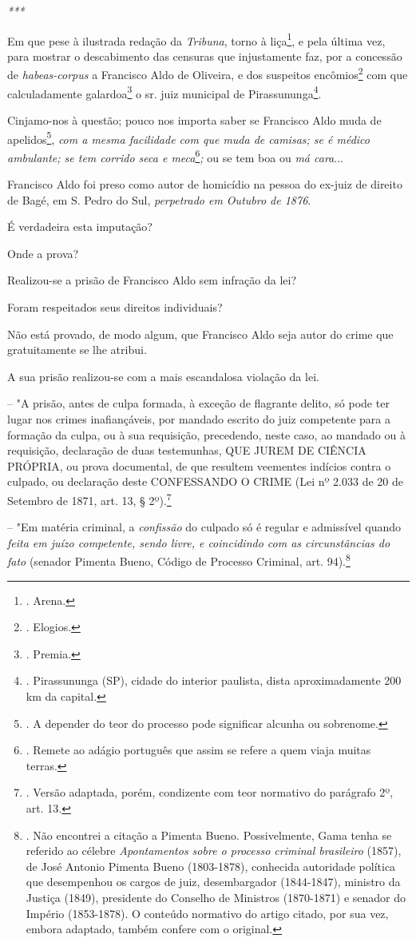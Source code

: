 \emph{***}

Em que pese à ilustrada redação da \emph{Tribuna}, torno à
liça\footnote{. Arena.}, e pela última vez, para mostrar o descabimento
das censuras que injustamente faz, por a concessão de
\emph{habeas-corpus} a Francisco Aldo de Oliveira, e dos suspeitos
encômios\footnote{. Elogios.} com que calculadamente galardoa\footnote{.
  Premia.} o sr. juiz municipal de Pirassununga\footnote{. Pirassununga
  (SP), cidade do interior paulista, dista aproximadamente 200 km da
  capital.}.

Cinjamo-nos à questão; pouco nos importa saber se Francisco Aldo muda de
apelidos\footnote{. A depender do teor do processo pode significar
  alcunha ou sobrenome.}, \emph{com a mesma facilidade com que muda de
camisas; se é médico ambulante; se tem corrido seca e meca}\footnote{.
  Remete ao adágio português que assim se refere a quem viaja muitas
  terras.}\emph{;} ou se tem boa ou \emph{má cara}...

Francisco Aldo foi preso como autor de homicídio na pessoa do ex-juiz de
direito de Bagé, em S. Pedro do Sul, \emph{perpetrado em Outubro de
1876}.

É verdadeira esta imputação?

Onde a prova?

Realizou-se a prisão de Francisco Aldo sem infração da lei?

Foram respeitados seus direitos individuais?

Não está provado, de modo algum, que Francisco Aldo seja autor do crime
que gratuitamente se lhe atribui.

A sua prisão realizou-se com a mais escandalosa violação da lei.

-- "A prisão, antes de culpa formada, à exceção de flagrante delito, só
pode ter lugar nos crimes inafiançáveis, por mandado escrito do juiz
competente para a formação da culpa, ou à sua requisição, precedendo,
neste caso, ao mandado ou à requisição, declaração de duas testemunhas,
QUE JUREM DE CIÊNCIA PRÓPRIA, ou prova documental, de que resultem
veementes indícios contra o culpado, ou declaração deste CONFESSANDO O
CRIME (Lei nº 2.033 de 20 de Setembro de 1871, art. 13, § 2º).\footnote{.
  Versão adaptada, porém, condizente com teor normativo do parágrafo 2º,
  art. 13.}

-- "Em matéria criminal, a \emph{confissão} do culpado só é regular e
admissível quando \emph{feita em juízo competente, sendo livre, e
coincidindo com as circunstâncias do fato} (senador Pimenta Bueno,
Código de Processo Criminal, art. 94).\footnote{. Não encontrei a
  citação a Pimenta Bueno. Possivelmente, Gama tenha se referido ao
  célebre \emph{Apontamentos sobre o processo criminal brasileiro}
  (1857), de José Antonio Pimenta Bueno (1803-1878), conhecida
  autoridade política que desempenhou os cargos de juiz, desembargador
  (1844-1847), ministro da Justiça (1849), presidente do Conselho de
  Ministros (1870-1871) e senador do Império (1853-1878). O conteúdo
  normativo do artigo citado, por sua vez, embora adaptado, também
  confere com o original.}

